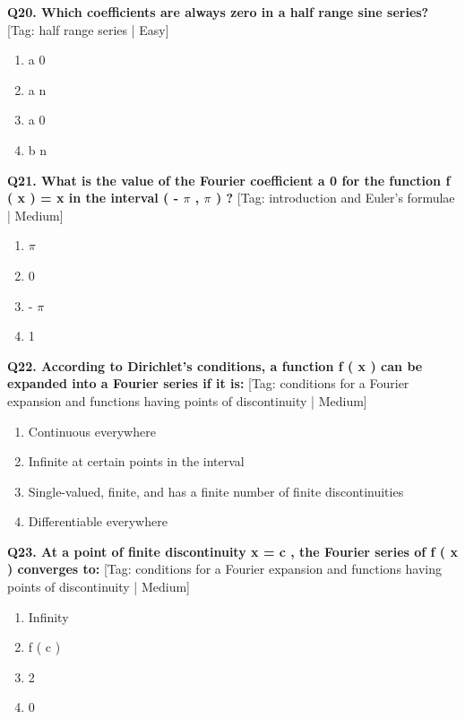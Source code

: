 \noindent\textbf{Q20. Which coefficients are always zero in a half range sine series?} \hfill [Tag: half range series | Easy]
\begin{enumerate}[label=(\alph*),topsep=2pt,itemsep=1pt,partopsep=0pt,parsep=0pt]
    \item {{a 0}}
    \item {{a n}}
    \item {{a 0}}
    \item {{b n}}
\end{enumerate}
\vspace{2mm}

\noindent\textbf{Q21. What is the value of the Fourier coefficient a 0 for the function f ( x ) = x in the interval ( - $\pi$ , $\pi$ ) ?} \hfill [Tag: introduction and Euler's formulae | Medium]
\begin{enumerate}[label=(\alph*),topsep=2pt,itemsep=1pt,partopsep=0pt,parsep=0pt]
    \item {{$\pi$}}
    \item {{0}}
    \item {{- $\pi$}}
    \item {{1}}
\end{enumerate}
\vspace{2mm}

\noindent\textbf{Q22. According to Dirichlet's conditions, a function f ( x ) can be expanded into a Fourier series if it is:} \hfill [Tag: conditions for a Fourier expansion and functions having points of discontinuity | Medium]
\begin{enumerate}[label=(\alph*),topsep=2pt,itemsep=1pt,partopsep=0pt,parsep=0pt]
    \item {{Continuous everywhere}}
    \item {{Infinite at certain points in the interval}}
    \item {{Single-valued, finite, and has a finite number of finite discontinuities}}
    \item {{Differentiable everywhere}}
\end{enumerate}
\vspace{2mm}

\noindent\textbf{Q23. At a point of finite discontinuity x = c , the Fourier series of f ( x ) converges to:} \hfill [Tag: conditions for a Fourier expansion and functions having points of discontinuity | Medium]
\begin{enumerate}[label=(\alph*),topsep=2pt,itemsep=1pt,partopsep=0pt,parsep=0pt]
    \item {{Infinity}}
    \item {{f ( c )}}
    \item {{2}}
    \item {{0}}
\end{enumerate}
\vspace{2mm}

